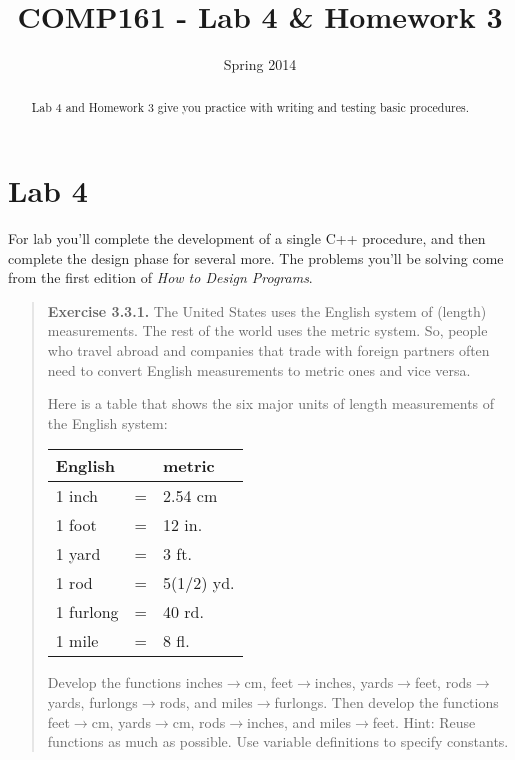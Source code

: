 \documentclass[]{tufte-handout}
\title{COMP161 - Lab 4 \& Homework 3}
\author{}
\date{Spring 2014}
\begin{document}
\maketitle

\begin{abstract}
Lab 4 and Homework 3 give you practice with writing and testing basic procedures.  
\end{abstract}

\section{Lab 4}

For lab you'll complete the development of a single C++ procedure, and then complete the design phase for several more. The problems you'll be solving come from the first edition of \textit{How to Design Programs}.
\begin{framed}
\begin{quote}
\textbf{Exercise 3.3.1.}   The United States uses the English system of (length) measurements. The rest of the world uses the metric system. So, people who travel abroad and companies that trade with foreign partners often need to convert English measurements to metric ones and vice versa.

Here is a table that shows the six major units of length measurements of the English system:


\begin{center}
\begin{tabular}{lcl}
English & &  metric \\ \hline
1 inch	&=&	2.54	cm \\
1 foot	&=&	12	in. \\
1 yard	&=&	3	ft. \\
1 rod	&=&	5(1/2)	yd.\\
1 furlong	&=&	40	rd.\\
1 mile	&=&	8	fl.
\end{tabular}
\end{center}

Develop the functions inches$\rightarrow$cm, feet$\rightarrow$inches, yards$\rightarrow$feet, rods$\rightarrow$yards, furlongs$\rightarrow$rods, and miles$\rightarrow$furlongs.
Then develop the functions feet$\rightarrow$cm, yards$\rightarrow$cm, rods$\rightarrow$inches, and miles$\rightarrow$feet.
Hint: Reuse functions as much as possible. Use variable definitions to specify constants.
\end{quote}
\end{framed}
\end{document}

